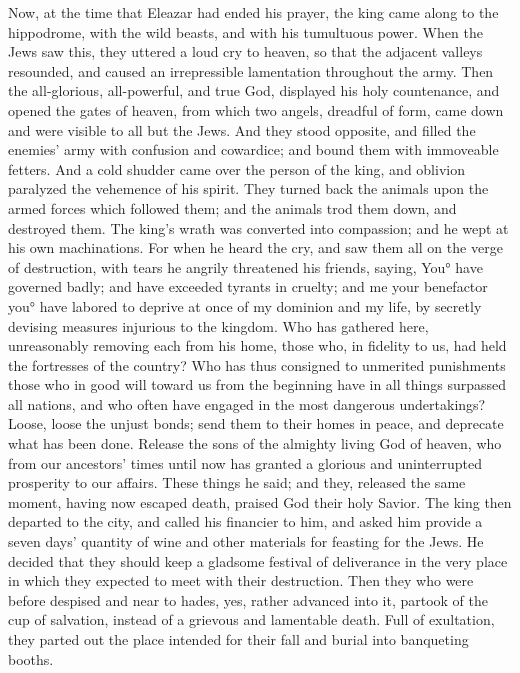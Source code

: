 {Now, at the time that Eleazar had ended his prayer, the king came along to the hippodrome, with the wild beasts, and with his tumultuous power.
When the Jews saw this, they uttered a loud cry to heaven, so that the adjacent valleys resounded, and caused an irrepressible lamentation throughout the army.
Then the all-glorious, all-powerful, and true God, displayed his holy countenance, and opened the gates of heaven, from which two angels, dreadful of form, came down and were visible to all but the Jews.
And they stood opposite, and filled the enemies’ army with confusion and cowardice; and bound them with immoveable fetters.
And a cold shudder came over the person of the king, and oblivion paralyzed the vehemence of his spirit.
They turned back the animals upon the armed forces which followed them; and the animals trod them down, and destroyed them.
The king’s wrath was converted into compassion; and he wept at his own machinations.
For when he heard the cry, and saw them all on the verge of destruction, with tears he angrily threatened his friends, saying,
You° have governed badly; and have exceeded tyrants in cruelty; and me your benefactor you° have labored to deprive at once of my dominion and my life, by secretly devising measures injurious to the kingdom.
Who has gathered here, unreasonably removing each from his home, those who, in fidelity to us, had held the fortresses of the country?
Who has thus consigned to unmerited punishments those who in good will toward us from the beginning have in all things surpassed all nations, and who often have engaged in the most dangerous undertakings?
Loose, loose the unjust bonds; send them to their homes in peace, and deprecate what has been done.
Release the sons of the almighty living God of heaven, who from our ancestors’ times until now has granted a glorious and uninterrupted prosperity to our affairs.
These things he said; and they, released the same moment, having now escaped death, praised God their holy Savior.
The king then departed to the city, and called his financier to him, and asked him provide a seven days’ quantity of wine and other materials for feasting for the Jews. He decided that they should keep a gladsome festival of deliverance in the very place in which they expected to meet with their destruction.
Then they who were before despised and near to hades, yes, rather advanced into it, partook of the cup of salvation, instead of a grievous and lamentable death. Full of exultation, they parted out the place intended for their fall and burial into banqueting booths.
}
